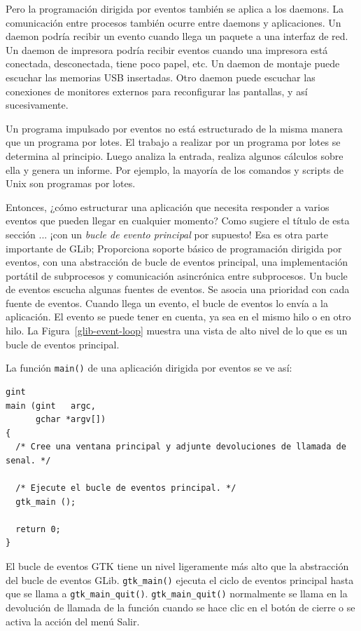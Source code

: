 Pero la programación dirigida por eventos también se aplica a los daemons. La comunicación entre procesos también ocurre entre daemons y aplicaciones. Un daemon podría recibir un evento cuando llega un paquete a una interfaz de red. Un daemon de impresora podría recibir eventos cuando una impresora está conectada, desconectada, tiene poco papel, etc. Un daemon de montaje puede escuchar las memorias USB insertadas. Otro daemon puede escuchar las conexiones de monitores externos para reconfigurar las pantallas, y así sucesivamente.

Un programa impulsado por eventos no está estructurado de la misma manera que un programa por lotes. El trabajo a realizar por un programa por lotes se determina al principio. Luego analiza la entrada, realiza algunos cálculos sobre ella y genera un informe. Por ejemplo, la mayoría de los comandos y scripts de Unix son programas por lotes.

Entonces, ¿cómo estructurar una aplicación que necesita responder a varios eventos que pueden llegar en cualquier momento? Como sugiere el título de esta sección ... ¡con un \emph{bucle de evento principal} por supuesto! Esa es otra parte importante de GLib; Proporciona soporte básico de programación dirigida por eventos, con una abstracción de bucle de eventos principal, una implementación portátil de subprocesos y comunicación asincrónica entre subprocesos. Un bucle de eventos escucha algunas fuentes de eventos. Se asocia una prioridad con cada fuente de eventos. Cuando llega un evento, el bucle de eventos lo envía a la aplicación. El evento se puede tener en cuenta, ya sea en el mismo hilo o en otro hilo. La Figura~\ref{glib-event-loop} muestra una vista de alto nivel de lo que es un bucle de eventos principal.

La función \lstinline{main()} de una aplicación dirigida por eventos se ve así:

\begin{lstlisting}[style=GLib/GTK]
gint
main (gint   argc,
      gchar *argv[])
{
  /* Cree una ventana principal y adjunte devoluciones de llamada de senal. */

  /* Ejecute el bucle de eventos principal. */
  gtk_main ();

  return 0;
}
\end{lstlisting}

El bucle de eventos GTK tiene un nivel ligeramente más alto que la abstracción del bucle de eventos GLib. \lstinline{gtk_main()} ejecuta el ciclo de eventos principal hasta que se llama a \lstinline{gtk_main_quit()}. \lstinline{gtk_main_quit()} normalmente se llama en la devolución de llamada de la función cuando se hace clic en el botón de cierre o se activa la acción del menú Salir.

